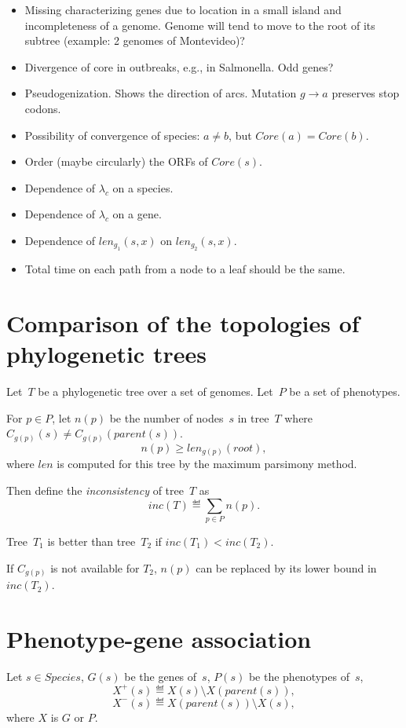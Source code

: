 \documentclass[10pt,a4paper]{article}
\theoremstyle{plain} \newtheorem{Lem}{Lemma}
\begin{document}
\Questions
\begin{itemize}
\item Missing characterizing genes due to location in a small island and incompleteness of a genome.
      Genome will tend to move to the root of its subtree (example: 2 genomes of Montevideo)?
\item Divergence of core in outbreaks, e.g., in Salmonella. Odd genes?
\item Pseudogenization. Shows the direction of arcs. Mutation $g \to a$ preserves stop codons.
\item Possibility of convergence of species: $a \ne b$, but $Core(a) = Core(b)$.
\item Order (maybe circularly) the ORFs of $Core(s)$.
\item Dependence of $\lambda_c$ on a species.
\item Dependence of $\lambda_c$ on a gene.
\item Dependence of $len_{g_1}(s,x)$ on $len_{g_2}(s,x)$.
\item Total time on each path from a node to a leaf should be the same.
\end{itemize}


\section {Comparison of the topologies of phylogenetic trees}
Let~$T$ be a phylogenetic tree over a set of genomes.
Let~$P$ be a set of phenotypes.

For $p \in P$, let $n(p)$ be the number of nodes~$s$ in tree~$T$ where $C_{g(p)}(s) \ne C_{g(p)}(parent(s))$.
$$ n(p) \ge len_{g(p)}(root), $$
where $len$ is computed for this tree by the maximum parsimony method.

Then define the {\em inconsistency} of tree~$T$ as
$$ inc(T) \eqdef \sum_{p \in P} n(p). $$

Tree~$T_1$ is better than tree~$T_2$ if $inc(T_1) < inc(T_2)$.

If $C_{g(p)}$ is not available for $T_2$, $n(p)$ can be replaced by its lower bound in $inc(T_2)$.


\section {Phenotype-gene association}

Let $s \in Species$,
$G(s)$ be the genes of~$s$,
$P(s)$ be the phenotypes of~$s$,
$$ X^+(s) \eqdef X(s) \setminus X(parent(s)), $$
$$ X^-(s) \eqdef X(parent(s)) \setminus X(s), $$
where $X$ is $G$ or $P$.
\end{document}

